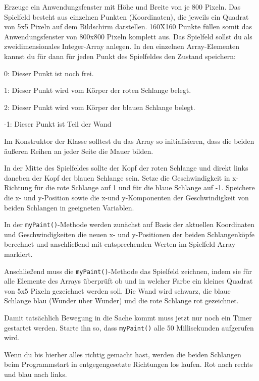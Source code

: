 \begin{compactenum}[a)]
\item Erzeuge ein Anwendungsfenster mit Höhe und Breite von je 800 Pixeln. Das
Spielfeld besteht aus einzelnen Punkten (Koordinaten), die jeweils ein Quadrat
von 5x5 Pixeln auf dem Bildschirm darstellen. 160X160 Punkte füllen somit das
Anwendungsfenster von 800x800 Pixeln komplett aus. Das Spielfeld sollst du als
zweidimensionales Integer-Array anlegen. In den einzelnen Array-Elementen
kannst du für dann für jeden Punkt des Spielfeldes den Zustand speichern:

	0: Dieser Punkt ist noch frei.	
	
	1: Dieser Punkt wird vom Körper der roten Schlange belegt.	
	
	2: Dieser Punkt wird vom Körper der blauen Schlange belegt.	
	
	-1: Dieser Punkt ist Teil der Wand	

Im Konstruktor der Klasse solltest du das Array so initialisieren, dass die
beiden äußeren Reihen an jeder Seite die Mauer bilden.

In der Mitte des Spielfeldes sollte der Kopf der roten Schlange und direkt
links daneben der Kopf der blauen Schlange sein. Setze die Geschwindigkeit in
x-Richtung für die rote Schlange auf 1 und für die blaue Schlange auf -1.
Speichere die x- und y-Position sowie die x-und y-Komponenten der
Geschwindigkeit von beiden Schlangen in geeigneten Variablen.

\item In der \lstinline|myPaint()|-Methode werden zunächst auf Basis der
aktuellen Koordinaten und Geschwindigkeiten die neuen x- und y-Positionen der
beiden Schlangenköpfe berechnet und anschließend mit entsprechenden Werten im
Spielfeld-Array markiert.

Anschließend muss die \lstinline|myPaint()|-Methode das Spielfeld zeichnen,
indem sie für alle Elemente des Arrays überprüft ob und in welcher Farbe ein
kleines Quadrat von 5x5 Pixeln gezeichnet werden soll. Die Wand wird schwarz,
die blaue Schlange blau (Wunder über Wunder) und die rote Schlange rot
gezeichnet.

Damit tatsächlich Bewegung in die Sache kommt muss jetzt nur noch ein Timer
gestartet werden. Starte ihn so, dass \lstinline|myPaint()| alle 50
Millisekunden aufgerufen wird.

\item Wenn du bis hierher alles richtig gemacht hast, werden die beiden
Schlangen beim Programmstart in entgegengesetzte Richtungen los laufen. Rot
nach rechts und blau nach links.


\end{compactenum}
